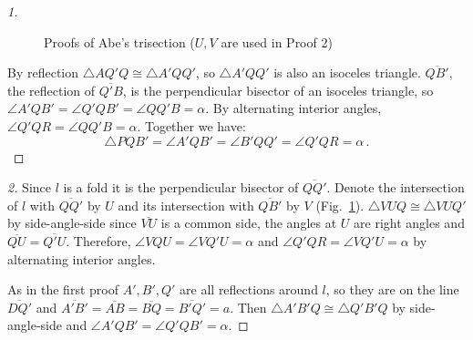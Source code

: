 \begin{proof}[1]
\begin{figure}[ht]
\begin{center}
\end{center}
\caption{Proofs of Abe's trisection ($U,V$ are used in Proof 2)}\label{f.abe2}
\end{figure}

By reflection $\triangle AQ'Q\cong \triangle A'QQ'$, so $\triangle A'QQ'$ is also an isoceles triangle.
$\overline{QB'}$, the reflection of $\overline{Q'B}$, is the perpendicular bisector of an isoceles triangle, so $\angle A'QB'=\angle Q'QB'=\angle QQ'B=\alpha$.
By alternating interior angles, $\angle Q'QR=\angle QQ'B=\alpha$.
Together we have:
\[
\triangle PQB'=\angle A'QB'=\angle B'QQ'=\angle Q'QR=\alpha\,.
\]
\end{proof}

\begin{proof}[2]
Since $l$ is a fold it is the perpendicular bisector of $\overline{QQ'}$. Denote the intersection of $l$ with $\overline{QQ'}$ by $U$ and its intersection with $\overline{QB'}$ by $V$ (Fig.~\ref{f.abe2}). $\triangle VUQ\cong \triangle VUQ'$ by side-angle-side since $\overline{VU}$ is a common side,  the angles at $U$ are right angles and $\overline{QU}=\overline{Q'U}$. Therefore, $\angle VQU=\angle VQ'U=\alpha$ and $\angle Q'QR=\angle VQ'U=\alpha$ by alternating interior angles.

As in the first proof $A', B', Q'$ are all reflections around $l$, so they are on the line $\overline{DQ'}$ and $\overline{A'B'}=\overline{AB}=\overline{BQ}=\overline{B'Q'}=a$. Then $\triangle A'B'Q\cong\triangle Q'B'Q$ by side-angle-side and $\angle A'QB'=\angle Q'QB'=\alpha$.
\end{proof}

